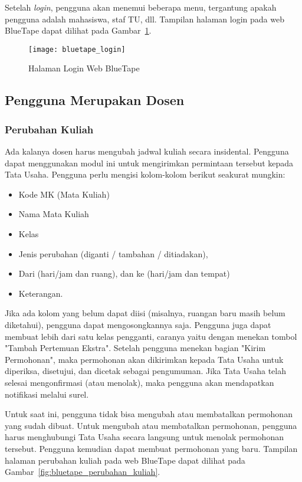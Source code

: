 Setelah \textit{login}, pengguna akan menemui beberapa menu, tergantung apakah pengguna adalah mahasiswa, staf TU, dll. Tampilan halaman login pada web BlueTape dapat dilihat pada \mbox{Gambar \ref{fig:bluetape_login}}.

\begin{figure}[H]
    \centering  
    \texttt{[image: bluetape\_login]}
    \caption[Halaman Login Web BlueTape]{Halaman Login Web BlueTape}
    \label{fig:bluetape_login}
\end{figure}

\subsection{Pengguna Merupakan Dosen}
\label{sec:bluetape_dosen}

\subsubsection{Perubahan Kuliah}
\label{sec:bluetape_perubahan_kuliah}
Ada kalanya dosen harus mengubah jadwal kuliah secara insidental. Pengguna dapat menggunakan modul ini untuk mengirimkan permintaan tersebut kepada Tata Usaha. Pengguna perlu mengisi kolom-kolom berikut seakurat mungkin:
\begin{itemize}
	\item Kode MK (Mata Kuliah)
	\item Nama Mata Kuliah
	\item Kelas
	\item Jenis perubahan (diganti / tambahan / ditiadakan),
	\item Dari (hari/jam dan ruang), dan ke (hari/jam dan tempat)
	\item Keterangan.
\end{itemize}

Jika ada kolom yang belum dapat diisi (misalnya, ruangan baru masih belum diketahui), pengguna dapat mengosongkannya saja. Pengguna juga dapat membuat lebih dari satu kelas pengganti, caranya yaitu dengan menekan tombol "Tambah Pertemuan Ekstra". Setelah pengguna menekan bagian "Kirim Permohonan", maka permohonan akan dikirimkan kepada Tata Usaha untuk diperiksa, disetujui, dan dicetak sebagai pengumuman. Jika Tata Usaha telah selesai mengonfirmasi (atau menolak), maka pengguna akan mendapatkan notifikasi melalui surel.

Untuk saat ini, pengguna tidak bisa mengubah atau membatalkan permohonan yang sudah dibuat. Untuk mengubah atau membatalkan permohonan, pengguna harus menghubungi Tata Usaha secara langsung untuk menolak permohonan tersebut. Pengguna kemudian dapat membuat permohonan yang baru. Tampilan halaman perubahan kuliah pada web BlueTape dapat dilihat pada \mbox{Gambar \ref{fig:bluetape_perubahan_kuliah}}.

